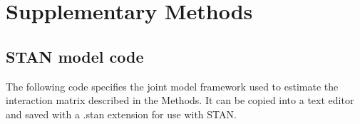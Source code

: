 \documentclass[a4,12pt]{article}
\begin{document}

 



% 
% 

\newpage

\printbibliography   

\newpage 

\section{Supplementary Methods}

    \subsection{STAN model code}

    The following code specifies the joint model framework used to estimate the interaction matrix described in the Methods. It can be copied into a text editor and saved with a .stan extension for use with STAN. 

    
\end{document}
